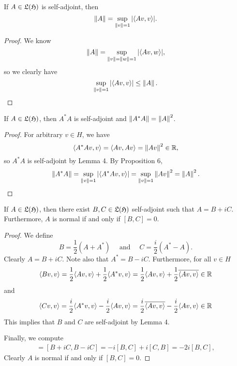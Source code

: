 \begin{proposition}
If $A \in \mathfrak{L} (\mathfrak{H})$ is self-adjoint, then 
\[
\left\|A\right\| = \sup_{\left\|v\right\| = 1} {\left|\langle Av, v \rangle\right|}.
\]
\end{proposition}

\begin{proof}
We know
\[
\left\|A\right\| = \sup_{\left\|v\right\| = \left\|w\right\| = 1} {\left|\langle Av, w \rangle\right|},
\]
so we clearly have
\[
\sup_{\left\|v\right\| = 1} {\left|\langle Av, v \rangle\right|} \leq \left\|A\right\|.
\]
\end{proof}

\begin{proposition}
If $A \in \mathfrak{L} (\mathfrak{H})$, then $A^*A$ is self-adjoint and $\left\|A^*A\right\| = \left\|A\right\|^2$.
\end{proposition}

\begin{proof}
For arbitrary $v \in H$, we have
\[
\langle A^*Av, v \rangle = \langle Av, Av \rangle = \left\|Av\right\|^2 \in \mathbb{R},
\]
so $A^*A$ is self-adjoint by Lemma 4. By Proposition 6,
\[
\left\|A^*A\right\| = \sup_{\left\|v\right\| = 1} {\left|\langle A^*Av, v \rangle\right|}  = \sup_{\left\|v\right\| = 1} \left\|Av\right\|^2 = \left\|A\right\|^2. 
\]
\end{proof}

\begin{proposition}
If $A \in \mathfrak{L} (\mathfrak{H})$, then there exist $B,C \in \mathfrak{L} (\mathfrak{H})$ self-adjoint such that $A = B+iC$. Furthermore, $A$ is normal if and only if $[B,C] = 0$.
\end{proposition}

\begin{proof}
We define
\[
B = \frac{1}{2}(A + A^*) \quad \text{ and } \quad C = \frac{i}{2}(A^* - A).
\]
Clearly $A = B + iC$. Note also that $A^* = B - iC$. Furthermore, for all $v \in H$
\begin{align*}
\langle Bv, v \rangle = \frac{1}{2} \langle Av, v \rangle + \frac{1}{2}\langle A^*v, v \rangle = \frac{1}{2}\langle Av, v \rangle + \frac{1}{2}\overline{\langle Av, v \rangle} \in \mathbb{R}
\end{align*}
and
\begin{align*}
\langle Cv, v \rangle = \frac{i}{2}\langle A^*v, v \rangle - \frac{i}{2}\langle Av, v \rangle = \frac{i}{2}\overline{\langle Av, v \rangle} - \frac{i}{2}\langle Av, v \rangle \in \mathbb{R}
\end{align*}
This implies that $B$ and $C$ are self-adjoint by Lemma 4.

Finally, we compute
\begin{align*}
[A, A^*] = [B + iC, B-iC] = -i[B, C] + i[C,B] = -2i[B,C],
\end{align*}
Clearly $A$ is normal if and only if $[B,C] = 0$. 
\end{proof}

